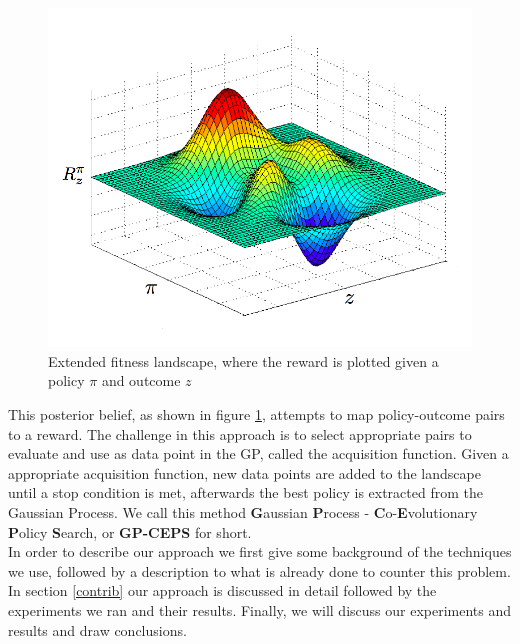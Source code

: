 \begin{figure}[ht]
  \centering
  \includegraphics[scale=0.29]{images/fitness-landscape.png}
  \caption{Extended fitness landscape, where the reward is plotted given a policy $\pi$ and outcome $z$}\label{fitnesslandscape}
\end{figure}

This posterior belief, as shown in figure \ref{fitnesslandscape}, attempts to map policy-outcome pairs to a reward. The challenge in this approach is to select appropriate pairs to evaluate and use as data point in the GP, called the acquisition function. Given a appropriate acquisition function, new data points are added to the landscape until a stop condition is met, afterwards the best policy is extracted from the Gaussian Process. We call this method \textbf{G}aussian \textbf{P}rocess - \textbf{C}o-\textbf{E}volutionary \textbf{P}olicy \textbf{S}earch, or \textbf{GP-CEPS} for short. \\


In order to describe our approach we first give some background of the techniques we use, followed by a description to what is already done to counter this problem. In section \ref{contrib} our approach is discussed in detail followed by the experiments we ran and their results. Finally, we will discuss our experiments and results and draw conclusions.


